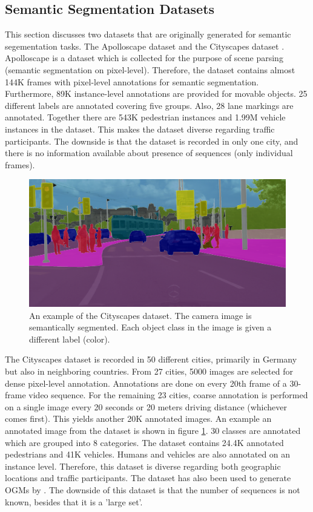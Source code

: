 \subsection{Semantic Segmentation Datasets} \label{subsec:data_sem_seg}
This section discusses two datasets that are originally generated for semantic segementation tasks. The Apolloscape dataset \cite{huang2019apolloscape}  and the Cityscapes dataset \cite{cordts2016cityscapes}. \\

Apolloscape \cite{huang2019apolloscape} is a dataset which is collected for the purpose of scene parsing (semantic segmentation on pixel-level). Therefore, the dataset contains almost 144K frames with pixel-level annotations for semantic segmentation. Furthermore, 89K instance-level annotations are provided for movable objects. 25 different labels are annotated covering five groups. Also, 28 lane markings are annotated. Together there are 543K pedestrian instances and 1.99M vehicle instances in the dataset. This makes the dataset diverse regarding traffic participants. The downside is that the dataset is recorded in only one city, and there is no information available about presence of sequences (only individual frames). \\

\begin{figure}[h!]
	\centering
	\includegraphics[width=0.6\linewidth]{Figures/Datasets/Cityscapes_Dataset}
	\caption{An example of the Cityscapes \cite{cordts2016cityscapes} dataset. The camera image is semantically segmented. Each object class in the image is given a different label (color).}  
	\label{fig:dat_cityscapes}
\end{figure}

The Cityscapes dataset \cite{cordts2016cityscapes} is recorded in 50 different cities, primarily in Germany but also in neighboring countries. From 27 cities, 5000 images are selected for dense pixel-level annotation. Annotations are done on every 20th frame of a 30-frame video sequence. For the remaining 23 cities, coarse annotation is performed on a single image every 20 seconds or 20 meters driving distance (whichever comes first). This yields another 20K annotated images. An example an annotated image from the dataset is shown in figure \ref{fig:dat_cityscapes}. 30 classes are annotated which are grouped into 8 categories. The dataset contains 24.4K annotated pedestrians and 41K vehicles. Humans and vehicles are also annotated on an instance level. Therefore, this dataset is diverse regarding both geographic locations and traffic participants. The dataset has also been used to generate \glspl{OGM} by \cite{hehn2021fast}. The downside of this dataset is that the number of sequences is not known, besides that it is a 'large set'. 

